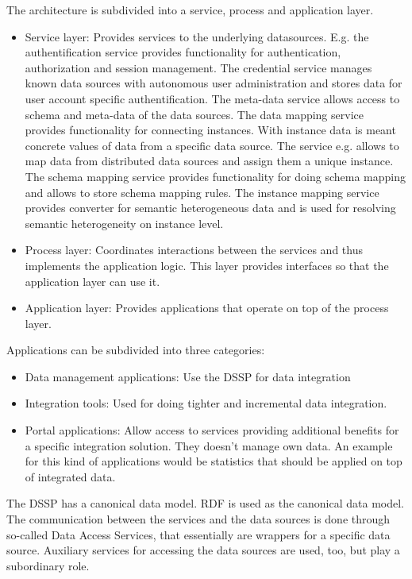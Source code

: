 The architecture is subdivided into a service, process and application layer.

\begin{itemize}
\item Service layer: Provides services to the underlying datasources. E.g. the authentification service provides functionality for authentication, authorization and session management. The credential service manages known data sources with autonomous user administration and stores data for user account specific authentification.
The meta-data service allows access to schema and meta-data of the data sources.
The data mapping service provides functionality for connecting instances. 
With instance data is meant concrete values of data from a specific data source. The service e.g. allows to map data from distributed data sources and assign them a unique instance.
The schema mapping service provides functionality for doing schema mapping and allows to store schema mapping rules.
The instance mapping service provides converter for semantic heterogeneous data and is used for resolving semantic heterogeneity on instance level.
\item Process layer: Coordinates interactions between the services and thus implements the application logic. This layer provides interfaces so that the application layer can use it.
\item Application layer: Provides applications that operate on top of the process layer.
\end{itemize}

Applications can be subdivided into three categories:
\begin{itemize}
\item Data management applications: Use the DSSP for data integration
\item Integration tools: Used for doing tighter and incremental data integration.
\item Portal applications: Allow access to services providing additional benefits for a specific integration solution. They doesn't manage own data.
An example for this kind of applications would be statistics that should be applied on top of integrated data.
\end{itemize}

The DSSP has a canonical data model. RDF is used as the canonical data model. 
The communication between the services and the data sources is done through so-called Data Access Services, that essentially are wrappers for a specific data source. Auxiliary services for accessing the data sources are used, too, but play a subordinary role. 

